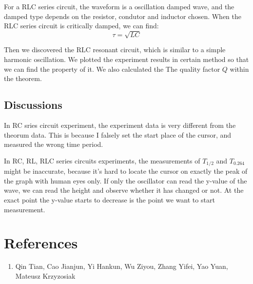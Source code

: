 \documentclass[12pt, a4paper]{article}
\begin{document}
For a RLC series circuit, the waveform is a oscillation damped wave, and the damped type depends on 
the resistor, condutor and inductor chosen. When the RLC series circuit is critically damped, we can find:
$$\tau=\sqrt{LC}$$

Then we discovered the RLC resonant circuit, which is similar to a simple harmonic 
oscillation. We plotted the experiment results in certain method so that we can find the 
property of it. We also calculated the The quality factor $Q$ within the theorem.
\\
\subsection{Discussions}
In RC sries circuit experiment, the experiment data is very different from the theorum data. 
This is because I falsely set the start place of the cursor, and measured the wrong time period.

In RC, RL, RLC series circuits experiments, the measurements of $T_{1/2}$ and $T_{0.264}$ might be 
inaccurate, because it's hard to locate the cursor on exactly the peak of the graph with human eyes only. If only the 
oscillator can read the y-value of the wave, we can read the height and observe whether it has changed 
or not. At the exact point the y-value starts to decrease is the point we want to start measurement.



\section{References}
    \begin{enumerate}
        \item Qin Tian, Cao Jianjun, Yi Hankun, Wu Ziyou, Zhang Yifei, Yao Yuan, Mateusz Krzyzosiak
    \end{enumerate}
\end{document}
